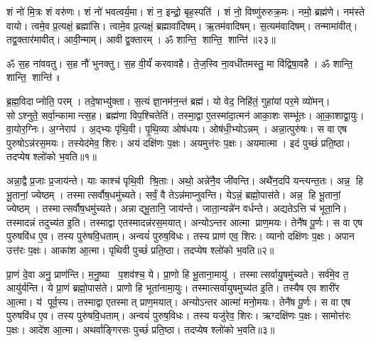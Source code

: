शं नो॑ मि॒त्रः  शं वरु॑णः। शं नो॑ भवत्वर्य॒मा। शं न॒ इन्द्रो॒ बृह॒स्पति॑। शं नो॒ विष्णु॑रुरुक्र॒मः। नमो॒ ब्रह्म॑णे। नम॑स्ते वायो। त्वमे॒व प्र॒त्यक्षं॒ ब्रह्मा॑सि। त्वामे॒व प्र॒त्यक्षं॒ ब्रह्मावा॑दिषम्। ऋ॒तम॑वादिषम्। स॒त्यम॑वादिषम्। तन्मामा॑वीत्। तद्व॒क्तार॑मावीत्। आवी॒न्माम्। आवीद्व॒क्तारम्। ॐ शान्ति॒ शान्ति॒ शान्ति॑॥२३॥
\anuvakamend[स॒त्यम॑वादिषं॒ पञ्च॑ च]


\setcounter{anuvakam}{0}
ॐ स॒ह ना॑ववतु। स॒ह नौ॑ भुनक्तु। स॒ह वी॒र्यं॑ करवावहै। ते॒ज॒स्वि ना॒वधी॑तमस्तु॒ मा वि॑द्विषा॒वहै। ॐ शान्ति॒ शान्ति॒ शान्ति॑॥%


ब्र॒ह्म॒विदाप्नोति॒ परम्। तदे॒षाभ्यु॑क्ता। स॒त्यं ज्ञा॒नम॑न॒न्तं ब्रह्म॑। यो वेद॒ निहि॑तं॒ गुहा॑यां पर॒मे व्यो॑मन्। सोऽश्नुते॒ सर्वा॒न्कामान्त्स॒ह। ब्रह्म॑णा विप॒श्चितेति॑। तस्मा॒द्वा ए॒तस्मा॑दा॒त्मन॑ आका॒शः सम्भू॑तः। आ॒का॒शाद्वा॒युः। वा॒योर॒ग्निः। अ॒ग्नेराप॑। अ॒द्भ्यः पृ॑थि॒वी। पृ॒थि॒व्या ओष॑धयः। ओष॑धी॒भ्योऽन्नम्। अन्ना॒त्पुरु॑षः। स वा एष पुरुषोऽन्न॑रस॒मयः। तस्येद॑मेव॒ शिरः। अयं दक्षि॑णः प॒क्षः। अयमुत्त॑रः प॒क्षः। अयमात्मा। इदं पुच्छं॑ प्रति॒ष्ठा। तदप्येष श्लो॑को भ॒वति॥१॥

अन्ना॒द्वै प्र॒जाः प्र॒जाय॑न्ते। याः काश्च॑ पृथि॒वी श्रि॒ताः। अथो॒ अन्ने॑नै॒व जी॑वन्ति। अथै॑न॒दपि॑ यन्त्यन्त॒तः। अन्न॒ हि भू॒तानां॒ ज्येष्ठम्। तस्मात्सर्वौष॒धमु॑च्यते। सर्वं॒ वै तेऽन्न॑माप्नुवन्ति। येऽन्नं॒ ब्रह्मो॒पास॑ते। अन्न॒ हि भू॒तानां॒ ज्येष्ठम्। तस्मात्सर्वौष॒धमु॑च्यते। अन्नाद्भू॒तानि॒ जाय॑न्ते। जाता॒न्यन्ने॑न वर्धन्ते। अद्यतेऽत्ति च॑ भूता॒नि। तस्मादन्नं तदुच्य॑त इ॒ति। तस्माद्वा एतस्मादन्न॑रस॒मयात्। अन्योऽन्तर आत्मा प्राण॒मयः। तेनै॑ष पू॒र्णः। स वा एष पुरुषवि॑ध ए॒व। तस्य पुरु॑षवि॒धताम्। अन्वयं॑ पुरुष॒विधः। तस्य प्राण॑ एव॒ शिरः। व्यानो दक्षि॑णः प॒क्षः। अपान उत्त॑रः प॒क्षः। आका॑श आ॒त्मा। पृथिवी पुच्छं॑ प्रति॒ष्ठा। तदप्येष श्लो॑को भ॒वति॥२॥

प्रा॒णं दे॒वा अनु॒ प्राण॑न्ति। म॒नु॒ष्या प॒शव॑श्च॒ ये। प्रा॒णो हि भू॒ताना॒मायु॑। तस्मात्सर्वायु॒षमु॑च्यते। सर्व॑मे॒व त॒ आयु॑र्\mbox{}यन्ति। ये प्रा॒णं ब्रह्मो॒पास॑ते। प्राणो हि भूता॑नामा॒युः। तस्मात्सर्वायुषमुच्य॑त इ॒ति। तस्यैष एव शारी॑र आ॒त्मा। य॑ पूर्व॒स्य। तस्माद्वा एतस्मात् प्राण॒मयात्। अन्योऽन्तर आत्मा॑ मनो॒मयः। तेनै॑ष पू॒र्णः। स वा एष पुरुषवि॑ध ए॒व। तस्य पुरु॑षवि॒धताम्। अन्वयं॑ पुरुष॒विधः। तस्य यजु॑रेव॒ शिरः। ऋग्दक्षि॑णः प॒क्षः। सामोत्त॑रः प॒क्षः। आदे॑श आ॒त्मा। अथर्वाङ्गिरसः पुच्छं॑ प्रति॒ष्ठा। तदप्येष श्लो॑को भ॒वति॥३॥

